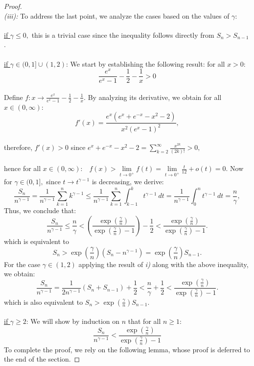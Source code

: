 \documentclass[10pt,a4paper]{amsart}
\begin{document}
\begin{proof}
\phantom{.} \\
\textit{(iii):}
 To address the last point, we analyze the cases based on the values of $\gamma:$ \\  \\
\underline{if $\gamma \leq 0,$} this is a trivial case since the inequality follows directly from \( S_{n} > S_{n-1} \). \\ \\ 
\underline{if $\gamma \in (0,1]\cup (1,2)$}: We start by establishing the following result: for all $x>0:$
$$ \frac{e^{x}}{e^{x}-1} - \frac{1}{2} - \frac{1}{x} > 0 $$
\phantom{.} \\
Define $\displaystyle f:x \to \frac{e^x}{e^x-1} - \frac{1}{2} - \frac{1}{x}.$ By analyzing its derivative, we obtain for all $x\in (0,\infty):$
$$ f'(x)= \frac{e^{x} (e^{x}+e^{-x}-x^2-2)}{x^2 (e^{x} -1)^2  }, $$ 
\phantom{.} \\ 
therefore, $f'(x)>0$ since $e^{x} + e^{-x} - x^2 - 2 = \displaystyle \sum_{k=2}^{\infty} \frac{x^{2k}}{(2k)!}> 0,$ \\ \\
hence for all $x\in (0,\infty):$ \ 
$\displaystyle f(x) > \lim\limits_{t\to 0^{+}} f(t) = \lim\limits_{t\to 0^{+}} \frac{t}{12} + o(t) = 0.$ Now for $\gamma \in (0,1],$ since $t\to t^{\gamma-1}$  is decreasing, we derive:
$$ \frac{S_n}{n^{\gamma-1}} = \frac{1}{n^{\gamma-1}}  \sum_{k=1}^{n} k^{\gamma-1} \leq  \frac{1}{n^{\gamma-1}}  \sum_{k=1}^{n} \int_{k-1}^{k} t^{\gamma-1} \ dt =  \frac{1}{n^{\gamma-1}} \int_{0}^{n} t^{\gamma-1} \ dt = \frac{n}{\gamma},
$$
Thus, we conclude that:
$$
\frac{S_n}{n^{\gamma-1}} \leq  \frac{n}{\gamma} < \left(\frac{\exp(\frac{\gamma}{n})}{\exp(\frac{\gamma}{n})-1}\right) -\frac{1}{2} < \frac{\exp(\frac{\gamma}{n})}{\exp(\frac{\gamma}{n})-1}.$$
which is equivalent to
$$ S_{n} > \exp(\frac{\gamma}{n})(S_{n}-n^{\gamma-1}) = \exp(\frac{\gamma}{n}) S_{n-1}.$$
For the case $\gamma \in (1,2)$ applying the result of \textit{ i)} along with the above inequality, we obtain:
$$ \frac{S_n}{n^{\gamma-1}} = \frac{1}{2 n^{\gamma-1}} (S_{n}+S_{n-1}) +\frac{1}{2} < \frac{n}{\gamma} + \frac{1}{2} < \frac{\exp(\frac{\gamma}{n})}{\exp(\frac{\gamma}{n})-1}.
$$
which is also equivalent to $S_{n} > \exp(\frac{\gamma}{n}) S_{n-1}.$ \\ \\
\underline{if $\gamma \geq 2$}: 
We will show by induction on \( n \) that for all $n \geq 1:$
$$ \frac{S_n}{n^{\gamma-1}} < \frac{\exp(\frac{\gamma}{n})}{\exp(\frac{\gamma}{n})-1}
$$
To complete the proof, we rely on the following lemma, whose proof is deferred to the end of the section.

\end{proof}
\end{document}
